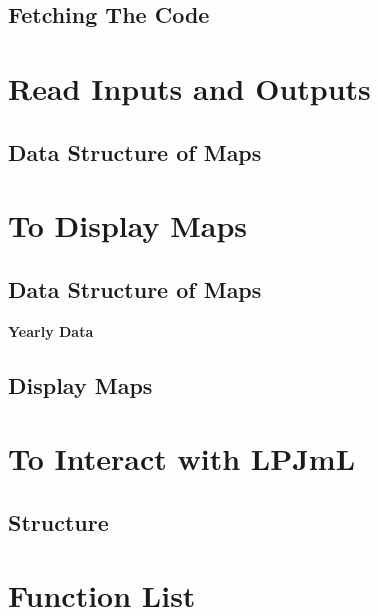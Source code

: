 \documentclass{article}
\begin{document}
\subsection{Fetching The Code}

\pagebreak

\section{Read Inputs and Outputs}
\subsection{Data Structure of Maps}
\pagebreak



\section{To Display Maps}
\subsection{Data Structure of Maps}
\textbf{Yearly Data} 

\subsection{Display Maps}

\pagebreak
\section{To Interact with LPJmL}
\subsection{Structure}

\pagebreak

\section{Function List}
\pagebreak
\end{document}
